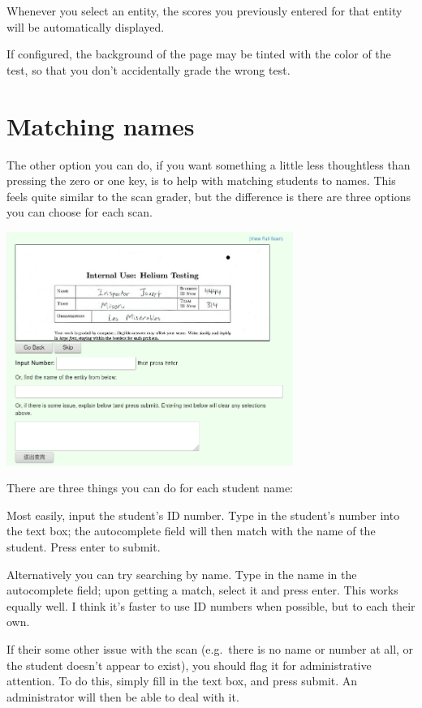 Whenever you select an entity,
the scores you previously entered for that
entity will be automatically displayed.

If configured, the background of the page may be tinted
with the color of the test, so that you don't accidentally grade
the wrong test.

\section{Matching names}
The other option you can do, if you want something a little
less thoughtless than pressing the zero or one key,
is to help with matching students to names.
This feels quite similar to the scan grader,
but the difference is there are three options you can choose
for each scan.

\begin{center}
	\includegraphics[width=0.7\textwidth]{images/fastmatch2.png}
\end{center}

There are three things you can do for each student name:
\begin{enumerate}
	\ii Most easily, input the student's ID number.
	Type in the student's number into the text box;
	the autocomplete field will then match with the name of the student.
	Press enter to submit.

	\ii Alternatively you can try searching by name.
	Type in the name in the autocomplete field;
	upon getting a match, select it and press enter.
	This works equally well.
	I think it's faster to use ID numbers when possible, but to each their own.

	\ii If their some other issue with the scan
	(e.g.\ there is no name or number at all,
	or the student doesn't appear to exist),
	you should flag it for administrative attention.
	To do this, simply fill in the text box, and press submit.
	An administrator will then be able to deal with it.
\end{enumerate}

